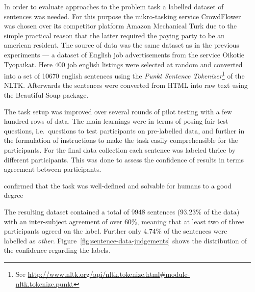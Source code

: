 In order to evaluate approaches to the problem task a labelled dataset of sentences was needed. For this purpose the \gls{mikro-tasking} service \gls{CrowdFlower} was chosen over its competitor platform \gls{Amazon Mechanical Turk} due to the simple practical reason that the latter required the paying party to be an american resident.
The source of data was the same dataset as in the previous experiments --- a dataset of English job advertisements from the service \gls{Oikotie Tyopaikat}. Here 400 job english listings were selected at random and converted into a set of 10670 english sentences using the \emph{Punkt Sentence Tokenizer}\footnote{See \url{http://www.nltk.org/api/nltk.tokenize.html\#module-nltk.tokenize.punkt}} of the \gls{NLTK}. Afterwards the sentences were converted from HTML into raw text using the \gls{Beautiful Soup} package.

The task setup was improved over several rounds of pilot testing with a few hundred rows of data. The main learnings were in terms of posing fair test questions, i.e.\ questions to test participants on pre-labelled data, and further in the formulation of instructions to make the task easily comprehensible for the participants. For the final data collection each sentence was labeled thrice by different participants. This was done to assess the confidence of results in terms agreement between participants.

confirmed that the task was well-defined and solvable for humans to a good degree

The resulting dataset contained a total of 9948 sentences (93.23\% of the data) with an inter-subject agreement of over 60\%, meaning that at least two of three participants agreed on the label. Further only 4.74\% of the sentences were labelled as \emph{other}. Figure~\ref{fig:sentence-data-judgements} shows the distribution of the confidence regarding the labels.

